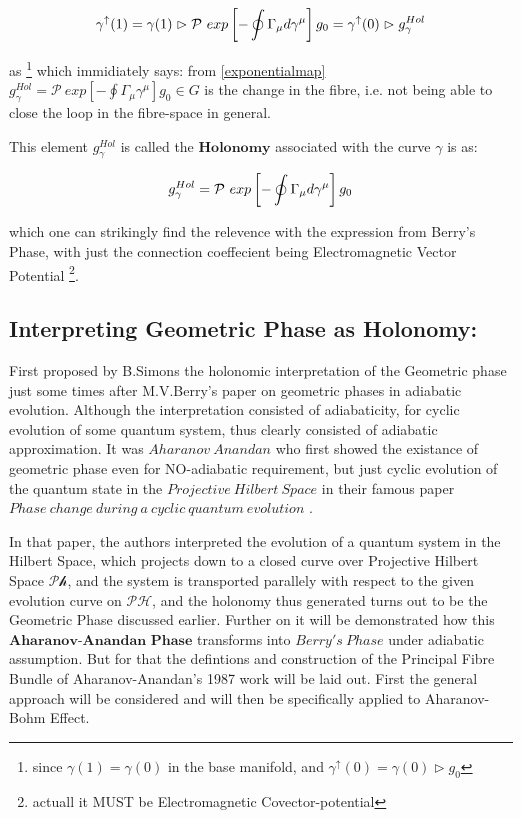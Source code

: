 \documentclass[8pt, twocoloumn]{article}
\begin{document}
\begin{align}{\label{bahbahbahbah}}
    \gamma^{\uparrow}(1) = \gamma(1) \vartriangleright  \mathcal{P} \ exp \left[ - \oint \Gamma_{\mu} d\gamma^{\mu}\right] g_0 = \gamma^{\uparrow}(0) \vartriangleright  g_{\gamma}^{Hol}
\end{align}

as \footnote{since $\gamma(1) = \gamma(0)$ in the base manifold, and $\gamma^{\uparrow}(0) = \gamma(0) \vartriangleright g_0$} which immidiately says: from \ref{exponentialmap} $g_{\gamma}^{Hol} = \mathcal{P} \ exp \left[ - \oint \Gamma_{\mu} \gamma^{\mu}\right] g_0 \in G$ is the change in the fibre, i.e. not being able to close the loop in the fibre-space in general. 

This element $g_{\gamma}^{Hol}$ is called the $\textbf{Holonomy}$ associated with the curve $\gamma$ is as:

\begin{align}{\label{exactholonomy}}
    g^{Hol}_{\gamma} = \mathcal{P} \ exp \left[ - \oint \Gamma_{\mu} d\gamma^{\mu}\right] g_0
\end{align}

which one can strikingly find the relevence with the expression from Berry's Phase, with just the connection coeffecient being Electromagnetic Vector Potential \footnote{actuall it MUST be Electromagnetic Covector-potential}.


\subsection{Interpreting Geometric Phase as Holonomy:}
First proposed by B.Simons \cite{simon} the holonomic interpretation of the Geometric phase just some times after M.V.Berry's paper on geometric phases in adiabatic evolution. Although the interpretation consisted of adiabaticity, for cyclic evolution of some quantum system, thus clearly consisted of adiabatic approximation. It was $Aharanov \ Anandan$ who first showed the existance of geometric phase even for NO-adiabatic requirement, but just cyclic evolution of the quantum state in the $Projective \ Hilbert \ Space$ in  their famous paper $Phase \  change  \ during \  a  \ cyclic \  quantum  \ evolution$ \cite{aharanovanandan}. 

In that paper, the authors interpreted the evolution of a quantum system in the Hilbert Space, which projects down to a closed curve over Projective Hilbert Space $\mathcal{Ph}$, and the system is transported parallely with respect to the given evolution curve on $\mathcal{PH}$, and the holonomy thus generated turns out to be the Geometric Phase discussed earlier. Further on it will be demonstrated how this $\textbf{Aharanov-Anandan Phase}$ transforms into $Berry's \ Phase$ under adiabatic assumption. But for that the defintions and construction of the Principal Fibre Bundle of Aharanov-Anandan's 1987 work will be laid out. First the general approach will be considered and will then be specifically applied to Aharanov-Bohm Effect.
\end{document}
